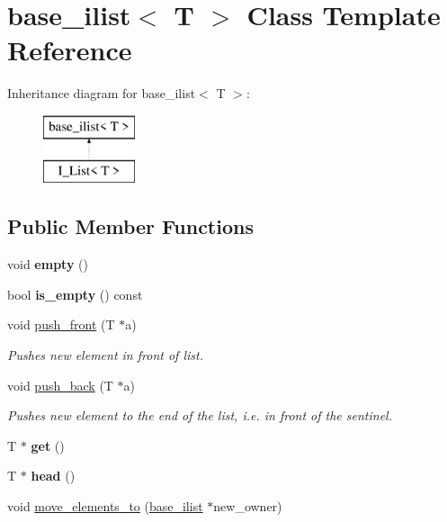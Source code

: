 \hypertarget{classbase__ilist}{}\section{base\+\_\+ilist$<$ T $>$ Class Template Reference}
\label{classbase__ilist}
Inheritance diagram for base\+\_\+ilist$<$ T $>$\+:\begin{figure}[H]
\begin{center}
\leavevmode
\includegraphics[height=2.000000cm]{classbase__ilist}
\end{center}
\end{figure}
\subsection*{Public Member Functions}
\begin{DoxyCompactItemize}
\item 
\mbox{\label{classbase__ilist_ace0e09d8f5523c3dd71e115fce41e4d0}} 
void {\bfseries empty} ()
\item 
\mbox{\label{classbase__ilist_a8e297a6785b5dd1c49a0848a9b08e903}} 
bool {\bfseries is\+\_\+empty} () const
\item 
\mbox{\label{classbase__ilist_ae744dde987b54a904245dae7cc1e9ce4}} 
void \mbox{\hyperlink{classbase__ilist_ae744dde987b54a904245dae7cc1e9ce4}{push\+\_\+front}} (T $\ast$a)
\begin{DoxyCompactList}\small\item\em Pushes new element in front of list. \end{DoxyCompactList}\item 
\mbox{\label{classbase__ilist_aec770ff00688db8703945d6f92976631}} 
void \mbox{\hyperlink{classbase__ilist_aec770ff00688db8703945d6f92976631}{push\+\_\+back}} (T $\ast$a)
\begin{DoxyCompactList}\small\item\em Pushes new element to the end of the list, i.\+e. in front of the sentinel. \end{DoxyCompactList}\item 
\mbox{\label{classbase__ilist_a13bb364f3c92af6cb6099550cc11fbff}} 
T $\ast$ {\bfseries get} ()
\item 
\mbox{\label{classbase__ilist_acbdde4a1648557d14144823dd997032c}} 
T $\ast$ {\bfseries head} ()
\item 
void \mbox{\hyperlink{classbase__ilist_a8e672dae8c5a44363d344aa06a47dc88}{move\+\_\+elements\+\_\+to}} (\mbox{\hyperlink{classbase__ilist}{base\+\_\+ilist}} $\ast$new\+\_\+owner)
\end{DoxyCompactItemize}
